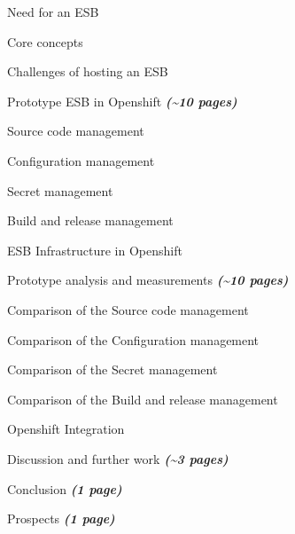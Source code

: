 \begin{numbered}
	\begin{numbered}
		\item Need for an ESB
		\item Core concepts
		\item Challenges of hosting an ESB 
	\end{numbered}
	\item Prototype ESB in Openshift \textbf{\textit{(\textasciitilde 10 pages)}}
	\begin{numbered}
		\item Source code management
		\item Configuration management
		\item Secret management
		\item Build and release management
		\item ESB Infrastructure in Openshift
	\end{numbered}
	\item Prototype analysis and measurements \textbf{\textit{(\textasciitilde 10 pages)}}
	\begin{numbered}
		\item Comparison of the Source code management
		\item Comparison of the Configuration management
		\item Comparison of the Secret management
		\item Comparison of the Build and release management
		\item Openshift Integration
	\end{numbered}
	\item Discussion and further work \textbf{\textit{(\textasciitilde 3 pages)}}			
	\item Conclusion \textbf{\textit{(1 page)}}
	\item Prospects \textbf{\textit{(1 page)}}
\end{numbered}